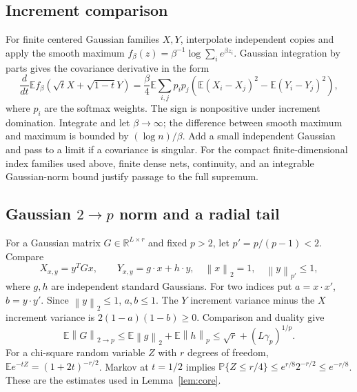 \documentclass[11pt]{article}
\theoremstyle{remark}\newtheorem{remark}[theorem]{Remark}
\newcommand{\R}{\mathbb R}\newcommand{\E}{\mathbb E}\newcommand{\Prob}{\mathbb P}
\newcommand{\norm}[1]{\left\|#1\right\|}\newcommand{\ip}[2]{\left\langle #1,#2\right\rangle}
\begin{document}
\subsection{Increment comparison}
For finite centered Gaussian families $X,Y$, interpolate independent copies and apply the smooth maximum $f_\beta(z)=\beta^{-1}\log\sum_i e^{\beta z_i}$. Gaussian integration by parts gives the covariance derivative in the form
\[
 \frac{d}{dt}\E f_\beta(\sqrt t X+\sqrt{1-t}Y)
 =\frac\beta4\E\sum_{i,j}p_ip_j
 \left(\E(X_i-X_j)^2-\E(Y_i-Y_j)^2\right),
\]
where $p_i$ are the softmax weights. The sign is nonpositive under increment domination. Integrate and let $\beta\to\infty$; the difference between smooth maximum and maximum is bounded by $(\log n)/\beta$. Add a small independent Gaussian and pass to a limit if a covariance is singular. For the compact finite-dimensional index families used above, finite dense nets, continuity, and an integrable Gaussian-norm bound justify passage to the full supremum.

\subsection[Gaussian matrix norm and a radial tail]{Gaussian $2\to p$ norm and a radial tail}
For a Gaussian matrix $G\in\R^{L\times r}$ and fixed $p>2$, let $p'=p/(p-1)<2$. Compare
\[
 X_{x,y}=y^TGx,\qquad Y_{x,y}=g\cdot x+h\cdot y,
 \quad\norm x_2=1,\quad\norm y_{p'}\le1,
\]
where $g,h$ are independent standard Gaussians. For two indices put $a=x\cdot x'$, $b=y\cdot y'$. Since $\norm y_2\le1$, $a,b\le1$. The $Y$ increment variance minus the $X$ increment variance is $2(1-a)(1-b)\ge0$. Comparison and duality give
\[
 \E\norm G_{2\to p}\le\E\norm g_2+\E\norm h_p
 \le\sqrt r+(L\gamma_p)^{1/p}.
\]
For a chi-square random variable $Z$ with $r$ degrees of freedom, $\E e^{-tZ}=(1+2t)^{-r/2}$. Markov at $t=1/2$ implies $\Prob\{Z\le r/4\}\le e^{r/8}2^{-r/2}\le e^{-r/8}$. These are the estimates used in Lemma~\ref{lem:core}.
\end{document}
